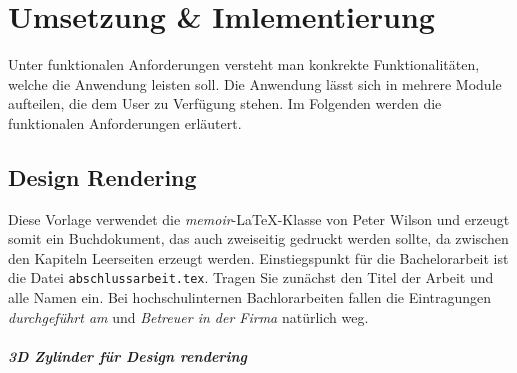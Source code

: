 %
%
%
\chapter{Umsetzung \& Imlementierung}
\label{cha:umsetzung}
%
Unter funktionalen Anforderungen versteht man konkrekte Funktionalitäten, welche die Anwendung leisten soll. Die Anwendung lässt sich in mehrere Module aufteilen, die dem User zu Verfügung stehen. Im Folgenden werden die funktionalen Anforderungen erläutert.
\section{Design Rendering}
\label{sec:umsetzung}
%
Diese Vorlage verwendet die \textit{memoir}-LaTeX-Klasse von Peter Wilson und erzeugt somit ein Buchdokument, das auch zweiseitig gedruckt werden sollte, da zwischen den Kapiteln Leerseiten erzeugt werden. Einstiegspunkt für die Bachelorarbeit ist die Datei \texttt{abschlussarbeit.tex}. Tragen Sie zunächst den Titel der Arbeit und alle Namen ein. Bei hochschulinternen Bachlorarbeiten fallen die Eintragungen \textit{durchgeführt am} und \textit{Betreuer in der Firma} natürlich weg. 
\paragraph{3D Zylinder für Design rendering}

